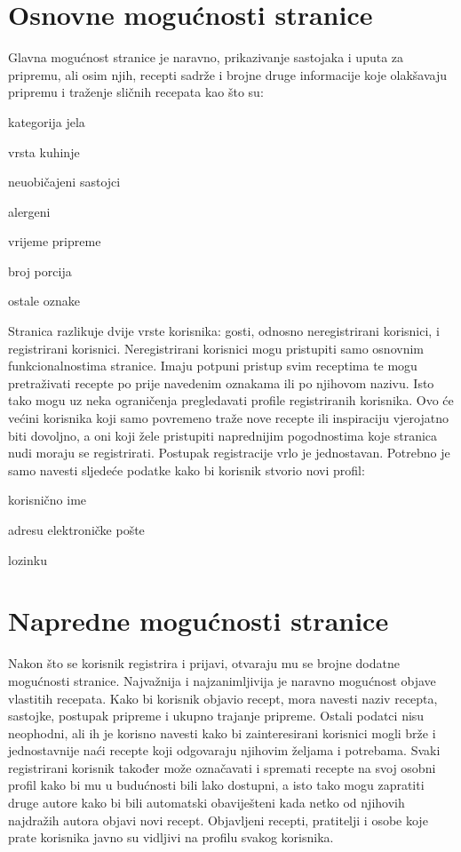 		\section{Osnovne mogućnosti stranice}
		Glavna mogućnost stranice je naravno, prikazivanje sastojaka i uputa za pripremu, ali osim njih, recepti sadrže i brojne druge informacije koje olakšavaju pripremu i traženje sličnih recepata kao što su:
		\begin{packed_item}
			\item kategorija jela
			\item vrsta kuhinje
			\item neuobičajeni sastojci
			\item alergeni
			\item vrijeme pripreme
			\item broj porcija
			\item ostale oznake
		\end{packed_item}
		Stranica razlikuje dvije vrste korisnika: gosti, odnosno neregistrirani korisnici, i registrirani korisnici. Neregistrirani korisnici mogu pristupiti samo osnovnim funkcionalnostima stranice. Imaju potpuni pristup svim receptima te mogu pretraživati recepte po prije navedenim oznakama ili po njihovom nazivu. Isto tako mogu uz neka ograničenja pregledavati profile registriranih korisnika. Ovo će većini korisnika koji samo povremeno traže nove recepte ili inspiraciju vjerojatno biti dovoljno, a oni koji žele pristupiti naprednijim pogodnostima koje stranica nudi moraju se registrirati.
		\linebreak
		Postupak registracije vrlo je jednostavan. Potrebno je samo navesti sljedeće podatke kako bi korisnik stvorio novi profil:
		\begin{packed_item}
			\item korisnično ime
			\item adresu elektroničke pošte
			\item lozinku
		\end{packed_item}
		
		\section{Napredne mogućnosti stranice}
		Nakon što se korisnik registrira i prijavi, otvaraju mu se brojne dodatne mogućnosti stranice. Najvažnija i najzanimljivija je naravno mogućnost objave vlastitih recepata. Kako bi korisnik objavio recept, mora navesti naziv recepta, sastojke, postupak pripreme i ukupno trajanje pripreme. Ostali podatci nisu neophodni, ali ih je korisno navesti kako bi zainteresirani korisnici mogli brže i jednostavnije naći recepte koji odgovaraju njihovim željama i potrebama.
		\linebreak
		\linebreak
		Svaki registrirani korisnik također može označavati i spremati recepte na svoj osobni profil kako bi mu u budućnosti bili lako dostupni, a isto tako mogu zapratiti druge autore kako bi bili automatski obaviješteni kada netko od njihovih najdražih autora objavi novi recept.
		Objavljeni recepti, pratitelji i osobe koje prate korisnika javno su vidljivi na profilu svakog korisnika.
